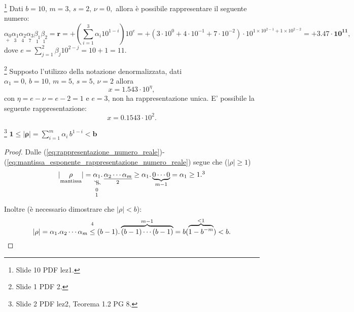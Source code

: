 \begin{example}\footnote{Slide 10 PDF lez1.}
	Dati $b=10,\, m=3,\, s=2,\, \nu=0,$ allora è possibile rappresentare il seguente numero:
	\begin{equation*}
		\underset{+}{\alpha_0}\underset{3}{\alpha_1}\underset{4}{\alpha_2}\underset{7}{\alpha_3}\underset{1}{\beta_1}\underset{1}{\beta_2}=\boldsymbol r=+\left(\sum_{i=1}^3\alpha_i10^{1-i}\right)10^{e}=+(3\cdot 10^0+4\cdot 10^{-1}+7\cdot 10^{-2})\cdot 10^{1\times 10^{2-1} + 1\times 10^{2-2}}=\boldsymbol{+3.47\cdot 10^{11}},
	\end{equation*}
	dove $e=\sum_{j=1}^2\beta_j10^{2-j}=10+1=11.$
\end{example}
\begin{example}
	\footnote{Slide 1 PDF 2.} Supposto l'utilizzo della notazione denormalizzata, dati $\alpha_1=0,\, b=10,\, m=5,\, s=5,\, \nu=2$ allora
	\begin{equation*}
		 x=1.543\cdot 10^\eta,
	\end{equation*}
	con $\eta=e-\nu=e-2=1$ e $e=3$, non ha rappresentazione unica. E' possibile la seguente rappresentazione:
	\begin{equation*}
		x=0.1543\cdot 10^2.
	\end{equation*} 
\end{example}

\begin{theorem}\footnote{Slide 2 PDF lez2, Teorema 1.2 PG 8.}
	$\boldsymbol{1\leq |\rho|}=\sum_{i=1}^m \alpha_i\, b^{1-i}\boldsymbol{<b}$
\end{theorem}
\begin{proof}
	Dalle (\ref{eq:rappresentazione_numero_reale})-(\ref{eq:mantissa_esponente_rappresentazione_numero_reale}) segue che ($|\rho|\geq 1$)
	\begin{equation*}
		|\underset{\text{mantissa}}{\rho}|= \underset{\footnotemark}{\neqto{\alpha_1}{0}}.\,\underset{\footnotemark}{\uline{\alpha_2\cdots\alpha_m}}\geq\alpha_1.\underbrace{0\cdots 0}_{m-1}=\alpha_1\geq 1.\footnotemark
	\end{equation*}
	Inoltre (è necessario dimostrare che $|\rho|<b$):
	\begin{equation*}
		|\rho|=\alpha_1.\alpha_2\cdots\alpha_m\overset{\footnotemark}{\leq}(b-1).\overbrace{(b-1)\cdots (b-1)}^{m-1}=b(\overbrace{1-b^{-m}}^{<1})<b.
	\end{equation*}
\end{proof}
\addtocounter{footnote}{-3}

